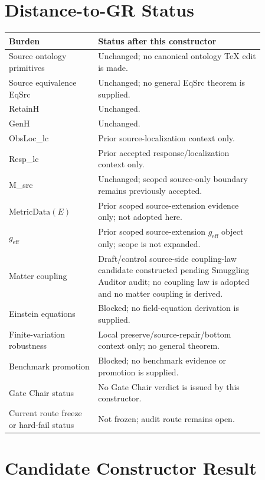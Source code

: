 \documentclass[11pt]{article}
\newcommand{\geff}{g_{\mathrm{eff}}}
\newcommand{\MetricData}{\mathrm{MetricData}}
\begin{document}
\section{Distance-to-GR Status}

\begin{longtable}{p{0.30\linewidth}p{0.56\linewidth}}
\toprule
Burden & Status after this constructor \\
\midrule
Source ontology primitives & Unchanged; no canonical ontology TeX edit is made. \\
Source equivalence EqSrc & Unchanged; no general EqSrc theorem is supplied. \\
RetainH & Unchanged. \\
GenH & Unchanged. \\
ObsLoc\_lc & Prior source-localization context only. \\
Resp\_lc & Prior accepted response/localization context only. \\
M\_src & Unchanged; scoped source-only boundary remains previously accepted. \\
\(\MetricData(E)\) & Prior scoped source-extension evidence only; not adopted here. \\
\(\geff\) & Prior scoped source-extension \(\geff\) object only; scope is not expanded. \\
Matter coupling & Draft/control source-side coupling-law candidate constructed pending Smuggling Auditor audit; no coupling law is adopted and no matter coupling is derived. \\
Einstein equations & Blocked; no field-equation derivation is supplied. \\
Finite-variation robustness & Local preserve/source-repair/bottom context only; no general theorem. \\
Benchmark promotion & Blocked; no benchmark evidence or promotion is supplied. \\
Gate Chair status & No Gate Chair verdict is issued by this constructor. \\
Current route freeze or hard-fail status & Not frozen; audit route remains open. \\
\bottomrule
\end{longtable}

\section{Candidate Constructor Result}
\end{document}
